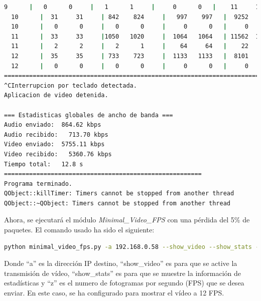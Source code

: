 \begin{lstlisting}[language=bash,basicstyle=\ttfamily\scriptsize]
   9      |   0      0     |   1      1     |     0      0   |    11     11   |  37      4
  10      |  31     31     | 842    824     |   997    997   |  9252   9054   |  48     85
  10      |   0      0     |   0      0     |     0      0   |     0      0   |  48     85
  11      |  33     33     |1050   1020     |  1064   1064   | 11562  11231   |  53     87
  11      |   2      2     |   2      1     |    64     64   |    22     11   |   0     87
  12      |  35     35     | 733    723     |  1133   1133   |  8101   7995   |  42     89
  12      |   0      0     |   0      0     |     0      0   |     0      0   |   0     89
============================================================================================
^CInterrupcion por teclado detectada.
Aplicacion de video detenida.

=== Estadisticas globales de ancho de banda ===
Audio enviado:	864.62 kbps
Audio recibido:   713.70 kbps
Video enviado:	5755.11 kbps
Video recibido:   5360.76 kbps
Tiempo total: 	12.8 s
=======================================================
Programa terminado.
QObject::killTimer: Timers cannot be stopped from another thread
QObject::~QObject: Timers cannot be stopped from another thread
\end{lstlisting}
\vspace{\baselineskip}

\newpage

Ahora, se ejecutará el módulo \textit{Minimal\_Video\_FPS} con una pérdida del 5\% de paquetes. El comando usado ha sido el siguiente:

\begin{lstlisting}[language=bash, basicstyle=\ttfamily\scriptsize]
    python minimal_video_fps.py -a 192.168.0.58 --show_video --show_stats -z 12
\end{lstlisting}
Donde ``a'' es la dirección IP destino, ``show\_video'' es para que se active la transmisión de vídeo, ``show\_stats'' es para que se muestre la información de estadísticas y ``z'' es el numero de fotogramas por segundo (FPS) que se desea enviar. En este caso, se ha configurado para mostrar el vídeo a 12 FPS.
\vspace{\baselineskip}

